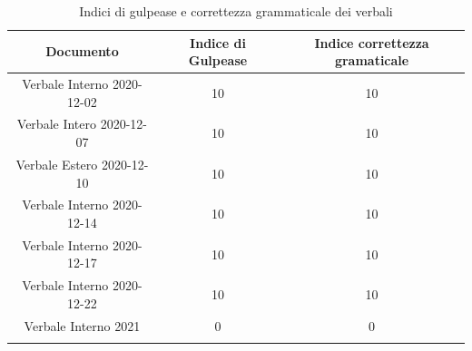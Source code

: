 \begin{center}
\begin{center}
        \begin{longtable}{|c|c|c}
      
        \hline
        \rowcolor{lighter-grayer}
        \textbf{Documento} & \textbf{Indice di Gulpease} & \textbf{Indice correttezza gramaticale} \\
       
        \hline
        \endfirsthead


        \hline

        Verbale Interno 2020-12-02 & 10 & 10 \\
        Verbale Intero 2020-12-07& 10 & 10 \\
        Verbale Estero 2020-12-10 & 10 & 10 \\
        Verbale Interno 2020-12-14 & 10 & 10 \\
        Verbale Interno 2020-12-17 & 10 & 10 \\
        Verbale Interno 2020-12-22 & 10 & 10 \\
        Verbale Interno 2021 & 0 & 0 \\

    
        \hline
        \caption{Indici di gulpease e correttezza grammaticale dei verbali}
        \end{longtable}
    \end{center}
\end{center}


